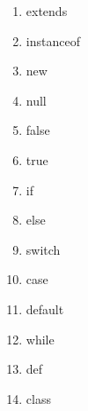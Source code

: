 \documentclass[a4paper,10pt]{scrreprt}
\newlength{\itemindentlen}
\begin{document}
\setlength{\itemindentlen}{\textwidth}
\begin{enumerate}
\addtolength{\itemindentlen}{-2em}

\item \begin{minipage}[t]{\itemindentlen}
extends
\end{minipage}

\item \begin{minipage}[t]{\itemindentlen}
instanceof
\end{minipage}

\item \begin{minipage}[t]{\itemindentlen}
new
\end{minipage}

\item \begin{minipage}[t]{\itemindentlen}
null
\end{minipage}

\item \begin{minipage}[t]{\itemindentlen}
false
\end{minipage}

\item \begin{minipage}[t]{\itemindentlen}
true
\end{minipage}

\item \begin{minipage}[t]{\itemindentlen}
if
\end{minipage}

\item \begin{minipage}[t]{\itemindentlen}
else
\end{minipage}

\item \begin{minipage}[t]{\itemindentlen}
switch
\end{minipage}

\item \begin{minipage}[t]{\itemindentlen}
case
\end{minipage}

\item \begin{minipage}[t]{\itemindentlen}
default
\end{minipage}

\item \begin{minipage}[t]{\itemindentlen}
while
\end{minipage}

\item \begin{minipage}[t]{\itemindentlen}
def
\end{minipage}

\item \begin{minipage}[t]{\itemindentlen}
class
\end{minipage}

\end{enumerate}
\end{document}

